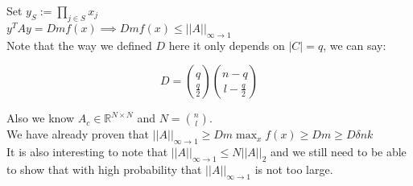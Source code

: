 \documentclass{article}
\begin{document}
\noindent Set $y_S := \displaystyle\prod_{j \in S} x_j$\\

\noindent $y^TAy = Dmf(x) \implies Dmf(x) \leq ||A||_{\infty \to 1}$\\

\noindent Note that the way we defined $D$ here it only depends on $|C| = q$, we can say:

\begin{equation*}
D = {q \choose \frac{q}{2}} {n-q \choose l - \frac{q}{2}}
\end{equation*}

\noindent Also we know $A_c \in \mathbb{R}^{N \times N}$ and $N = {n \choose l}$.\\

\noindent We have already proven that $||A||_{\infty \to 1} \geq Dm \max_{x}f(x) \geq Dm \geq D \delta nk$\\

\noindent It is also interesting to note that $||A||_{\infty \to 1} \leq N ||A||_2$ and we still need to be able to show that with high probability that $||A||_{\infty \to 1}$ is not too large.

\newpage

\end{document}

